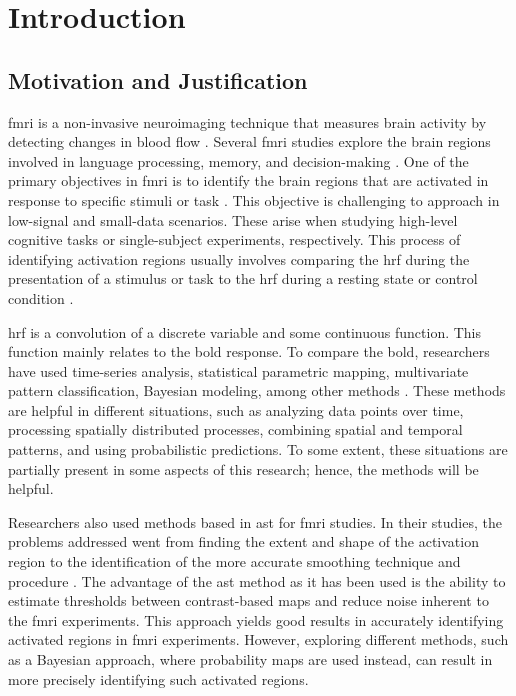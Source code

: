 \chapter{Introduction}

\section{Motivation and Justification}

\gls{fmri} is a non-invasive neuroimaging technique that measures brain 
activity by detecting changes in blood flow \cite{buchbinder2016functional, 
logothetis2008we, christopher2008applications}. Several \gls{fmri} studies 
explore the brain regions involved in language processing, memory, and 
decision-making \cite{gaillard2003developmental,golby2005memory,heekeren2003fmri}. 
One of the primary objectives in \gls{fmri} is to identify the brain regions 
that are activated in response to specific stimuli or 
task \cite{orchard2003simultaneous, deneux2006using, ardekani1999activation}. 
This objective is challenging to approach in low-signal and small-data scenarios. 
These arise when studying high-level cognitive tasks or single-subject 
experiments, respectively. This process of identifying activation regions 
usually involves comparing the \gls{hrf} during the presentation of a 
stimulus or task to the \gls{hrf} during a resting state or control 
condition \cite{arthurs2002well, logothetis2004nature, lee2013resting}.

\gls{hrf} is a convolution of a discrete variable and some continuous 
function. This function mainly relates to the \gls{bold} response. 
To compare the \gls{bold}, researchers have used time-series analysis, 
statistical parametric mapping, multivariate pattern classification, 
Bayesian modeling, among other methods 
\cite{adrian2018complex, marchini2004comparing, mumford2012deconvolving, makni2008fully}. 
These methods are helpful in different situations, such as analyzing data 
points over time, processing spatially distributed processes, combining 
spatial and temporal patterns, and using probabilistic predictions. 
To some extent, these situations are partially present in some aspects 
of this research; hence, the methods will be helpful.

Researchers also used methods based in \gls{ast} for \gls{fmri} studies. 
In their studies, the problems addressed went from finding the extent and 
shape of the activation region to the identification of the more accurate 
smoothing technique and procedure 
\cite{tabelow2006analyzing, lindquist2010adaptive, strappini2017adaptive,almodovar2019fast}. 
The advantage of the \gls{ast} method as it has been used is the ability to 
estimate thresholds between contrast-based maps and reduce noise inherent to 
the \gls{fmri} experiments. This approach yields good results in accurately 
identifying activated regions in \gls{fmri} experiments. However, exploring 
different methods, such as a Bayesian approach, where probability maps are 
used instead, can result in more precisely identifying such activated regions.

